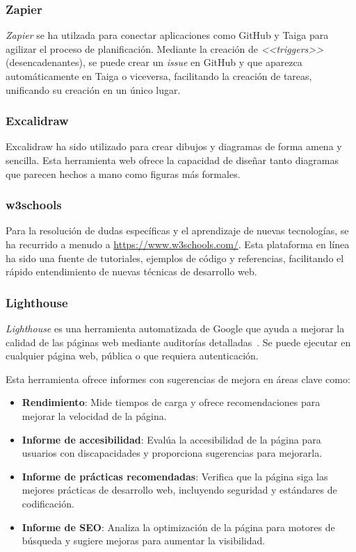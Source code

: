 \subsubsection{Zapier}
\textit{Zapier} se ha utilzada para conectar aplicaciones como GitHub y Taiga para agilizar el proceso de planificación. Mediante la creación de \textit{<<triggers>>} (desencadenantes), se puede crear un \textit{issue} en GitHub y que aparezca automáticamente en Taiga o viceversa, facilitando la creación de tareas, unificando su creación en un único lugar.

\subsubsection{Excalidraw}
Excalidraw ha sido utilizado para crear dibujos y diagramas de forma amena y sencilla. Esta herramienta web ofrece la capacidad de diseñar tanto diagramas que parecen hechos a mano como figuras más formales.

\subsubsection{w3schools}
Para la resolución de dudas específicas y el aprendizaje de nuevas tecnologías, se ha recurrido a menudo a \url{https://www.w3schools.com/}. Esta plataforma en línea ha sido una fuente de tutoriales, ejemplos de código y referencias, facilitando el rápido entendimiento de nuevas técnicas de desarrollo web.

\subsubsection{Lighthouse}
\textit{Lighthouse} es una herramienta automatizada de Google que ayuda a mejorar la calidad de las páginas web mediante auditorías detalladas~\cite{web:lighthouse}. Se puede ejecutar en cualquier página web, pública o que requiera autenticación.

Esta herramienta ofrece informes con sugerencias de mejora en áreas clave como:
\begin{itemize}
	\item \textbf{Rendimiento}: Mide tiempos de carga y ofrece recomendaciones para mejorar la velocidad de la página.
	\item \textbf{Informe de accesibilidad}: Evalúa la accesibilidad de la página para usuarios con discapacidades y proporciona sugerencias para mejorarla.
	\item \textbf{Informe de prácticas recomendadas}: Verifica que la página siga las mejores prácticas de desarrollo web, incluyendo seguridad y estándares de codificación.
	\item \textbf{Informe de SEO}: Analiza la optimización de la página para motores de búsqueda y sugiere mejoras para aumentar la visibilidad.
\end{itemize}

